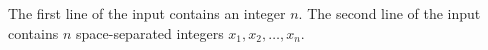 The first line of the input contains an integer $n$.
The second line of the input contains $n$ space-separated integers $x_1,x_2,\ldots,x_n$.